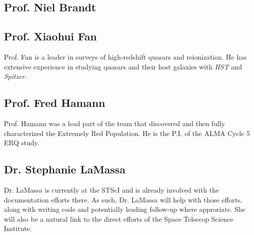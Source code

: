 \iffalse
\subsection*{Prof. Beth Biller}
Prof. Biller is an expert in infrared coronagraphic observations. 
While we do not intend to use the MIRI coronagraphs in this proposal, 
longer term observations would potentially involve observing the ERQs
with the Lyot or 4QPM if this became appropriate and technically feasible. 
\fi

\subsection*{Prof. Niel Brandt}


\subsection*{Prof. Xiaohui Fan}
Prof. Fan is a leader in surveys of high-redshift quasars and
reionization. He has extensive experience in studying quasars and
their host galaxies with {\it HST} and {\it Spitzer}.


\subsection*{Prof. Fred Hamann}
Prof. Hamann was a lead part of the team that discovered and then
fully characterized the Extremely Red Population. He is the P.I. of
the ALMA Cycle 5 ERQ study.




\iffalse
\subsection*{Prof. Linhua Jiang}
\fi


\subsection*{Dr. Stephanie LaMassa}
Dr. LaMassa is currently at the STScI and is already involved with the
documentation efforts there. As such, Dr. LaMassa will help with those
efforts, along with writing code and potentially leading follow-up
where approriate. She will also be a natural link to the direct
efforts of the Space Telsecop Science Institute.


